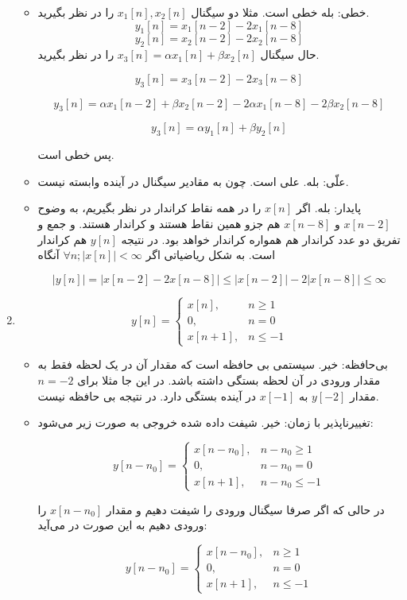 \documentclass[12pt]{article}
\begin{document}
\begin{enumerate}[label = \harfi*)]
\begin{itemize}
	\item
	خطی: بله خطی است. مثلا دو سیگنال
	 $x_1[n],x_2[n]$
	 را در نظر بگیرید.
	 $$y_1[n] =x_1[n-2] - 2 x_1[n-8]$$
	 $$y_2[n] =x_2[n-2] - 2 x_2[n-8]$$
	 حال سیگنال
	 $x_3[n] = \alpha x_1[n] + \beta x_2[n]$
	 را در نظر بگیرید.
	 
	 $$y_3[n] = x_3[n-2] - 2 x_3[n-8]$$
	 
	 $$y_3[n] = \alpha x_1[n-2] + \beta x_2[n-2] - 2\alpha x_1[n-8] - 2 \beta x_2[n-8]$$
	 
	 $$y_3[n] = \alpha y_1[n] + \beta y_2[n]$$
	 
	 پس خطی است.
	\item
	علّی: بله. علی است. چون به مقادیر سیگنال در آینده وابسته نیست. 
	\item
	پایدار: بله. اگر $x[n]$ را در همه نقاط کراندار در نظر بگیریم، به وضوح $x[n-2]$ و $x[n-8]$ هم جزو همین نقاط هستند و کراندار هستند. و جمع و تفریق دو عدد کراندار هم همواره کراندار خواهد بود. در نتیجه $y[n]$ هم کراندار است. به شکل ریاضیاتی اگر
	$\forall n; |x[n]|<\infty$ آنگاه
	
	$$|y[n]| = |x[n-2] - 2x[n-8]| \leq |x[n-2]| - 2|x[n-8]| \leq \infty$$
\end{itemize}


\item
$$
y[n]=\left\{\begin{array}{lc}
	x[n], & n \geq 1 \\
	0, & n=0 \\
	x[n+1], & n \leq-1
\end{array}\right.
$$
\begin{itemize}
	\item
	بی‌حافظه: خیر. سیستمی بی حافظه است که مقدار آن در یک لحظه فقط به مقدار ورودی در آن لحظه بستگی داشته باشد. در این جا مثلا برای $n=-2$ مقدار $y[-2]$ به $x[-1]$ در آینده بستگی دارد. در نتیجه بی حافظه نیست.
	\item
	تغییرناپذیر با زمان: خیر. شیفت داده شده خروجی به صورت زیر می‌شود:
	
$$
y[n-n_0]=\left\{\begin{array}{lc}
	x[n-n_0], & n-n_0 \geq 1 \\
	0, & n-n_0=0 \\
	x[n+1], & n-n_0 \leq-1
\end{array}\right.
$$	 

در حالی که اگر صرفا سیگنال ورودی را شیفت دهیم و مقدار 
$x[n-n_0]$
را ورودی دهیم به این صورت در می‌آید:

$$
y[n-n_0]=\left\{\begin{array}{lc}
	x[n-n_0], & n \geq 1 \\
	0, & n=0 \\
	x[n+1], & n \leq-1
\end{array}\right.
$$	 


\end{itemize}
\end{enumerate}
\end{document}
